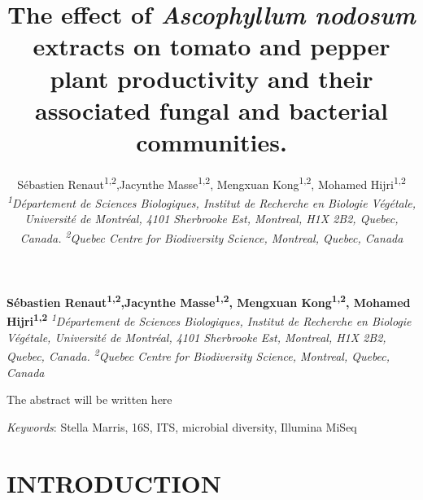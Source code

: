 \documentclass[11pt,]{article}
\title{\textbf{The effect of \emph{Ascophyllum nodosum} extracts on tomato and
pepper plant productivity and their associated fungal and bacterial
communities.}  }
\author{\Large Sébastien Renaut\textsuperscript{1,2},Jacynthe
Masse\textsuperscript{1,2}, Mengxuan Kong\textsuperscript{1,2}, Mohamed
Hijri\textsuperscript{1,2}\vspace{0.05in} \newline\normalsize\emph{\textsuperscript{1}Département de Sciences Biologiques, Institut de
Recherche en Biologie Végétale, Université de Montréal, 4101 Sherbrooke
Est, Montreal, H1X 2B2, Quebec, Canada. \textsuperscript{2}Quebec Centre
for Biodiversity Science, Montreal, Quebec, Canada}  }
\date{}
\newcommand*{\authorfont}{\fontfamily{phv}\selectfont}
\renewenvironment{abstract}
 {{%
    \setlength{\leftmargin}{0mm}
    \setlength{\rightmargin}{\leftmargin}%
  }%
  \relax}
 {\endlist}
\begin{document}
	
%

{%
\setlength{\parindent}{0pt}
\thispagestyle{plain}
{\fontsize{18}{20}\selectfont\raggedright 
\maketitle  %

}

{
   \vskip 13.5pt\relax \normalsize\fontsize{11}{12} 
\textbf{\authorfont Sébastien Renaut\textsuperscript{1,2},Jacynthe
Masse\textsuperscript{1,2}, Mengxuan Kong\textsuperscript{1,2}, Mohamed
Hijri\textsuperscript{1,2}} \hskip 15pt \emph{\small \textsuperscript{1}Département de Sciences Biologiques, Institut de
Recherche en Biologie Végétale, Université de Montréal, 4101 Sherbrooke
Est, Montreal, H1X 2B2, Quebec, Canada. \textsuperscript{2}Quebec Centre
for Biodiversity Science, Montreal, Quebec, Canada}   

}

}








\begin{abstract}

    \hbox{\vrule height .2pt width 39.14pc}

    \vskip 8.5pt %

\noindent The abstract will be written here


\vskip 8.5pt \noindent \emph{Keywords}: Stella Marris, 16S, ITS, microbial diversity, Illumina MiSeq \par

    \hbox{\vrule height .2pt width 39.14pc}



\end{abstract}


\vskip 6.5pt


\noindent \doublespacing \newpage 

\section{INTRODUCTION}\label{introduction}
\end{document}

